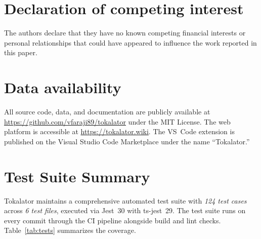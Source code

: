 \documentclass[a4paper,fleqn]{cas-dc}
\begin{document}
\section*{Declaration of competing interest}

The authors declare that they have no known competing financial interests or personal relationships that could have appeared to influence the work reported in this paper.

\section*{Data availability}

All source code, data, and documentation are publicly available at \url{https://github.com/vfaraji89/tokalator} under the MIT License. The web platform is accessible at \url{https://tokalator.wiki}. The VS~Code extension is published on the Visual Studio Code Marketplace under the name ``Tokalator.''

%

\appendix


\section{Test Suite Summary}
\label{app:tests}

Tokalator maintains a comprehensive automated test suite with \textit{124 test cases} across \textit{6 test files}, executed via Jest~30 with ts-jest~29. The test suite runs on every commit through the CI pipeline alongside build and lint checks. Table~\ref{tab:tests} summarizes the coverage.
\end{document}
